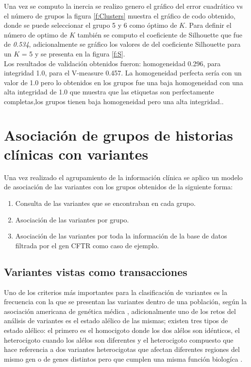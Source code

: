 Una vez se computo la inercia se realizo genero el gráfico del error cuadrático vs el número de grupos  la figura \ref{f:Clusters} muestra el gráfico de codo obtenido, donde se puede seleccionar el grupo 5 y 6 como óptimo de $K$. Para definir el número de optimo de $K$ también se computo el coeficiente de Silhouette  que fue de \textit{0.534}, adicionalmente se gráfico los valores de del coeficiente Silhouette para un $K$ = 5 y se presenta en la figura \ref{f:S}. \\

Los resultados de validación obtenidos fueron: homogeneidad 0.296, para integridad 1.0, para el V-measure 0.457. La homogeneidad perfecta sería con un valor de 1.0 pero lo obtenidos en los grupos fue una baja homogeneidad con una alta  integridad de 1.0 que muestra que las etiquetas son perfectamente completas,los grupos tienen  baja homogeneidad pero una alta integridad.\cite{scikit-learn}. 


\section{Asociación de grupos de historias clínicas con variantes}

Una vez realizado el agrupamiento de la información clínica se aplico un modelo de asociación de las variantes con los grupos obtenidos de la siguiente forma:

\begin{enumerate}
	\item Consulta de las variantes que se encontraban en cada grupo.
	\item Asociación de las variantes por grupo.
	\item Asociación de las variantes por toda la información de la base de datos filtrada por el gen CFTR como caso de ejemplo.
\end{enumerate}

\subsection{Variantes vistas como transacciones}

Uno de los criterios más importantes para la clasificación de variantes es la frecuencia con la que se presentan las variantes dentro de una población, según la asociación americana de genética médica \cite{Laboratories2015}, adicionalmente uno de los retos del análisis de variantes es el estado alélico de las mismas; existen tres tipos de estado alélico: el primero es el homocigoto donde los dos alélos son idénticos, el heterocigoto cuando los alélos son diferentes y el heterocigoto compuesto que hace referencia a dos variantes heterocigotas que afectan diferentes regiones del mismo gen o de genes distintos pero que cumplen una misma función biologíca \cite{Klug2013,Compound2012}.\\


